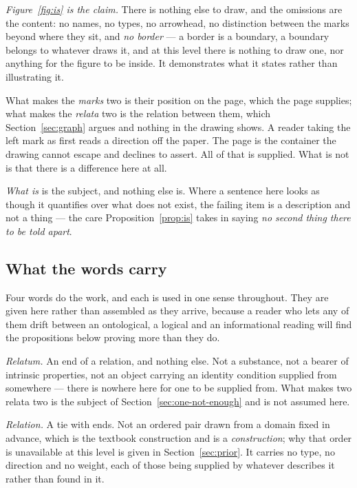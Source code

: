 \documentclass[11pt,a4paper]{article}
\begin{document}
\emph{Figure~\ref{fig:is} is the claim.} There is nothing else to draw, and the omissions are the content: no names, no types, no arrowhead, no distinction between the marks beyond where they sit, and \emph{no border} --- a border is a boundary, a boundary belongs to whatever draws it, and at this level there is nothing to draw one, nor anything for the figure to be inside. It demonstrates what it states rather than illustrating it.

What makes the \emph{marks} two is their position on the page, which the page supplies; what makes the \emph{relata} two is the relation between them, which Section~\ref{sec:graph} argues and nothing in the drawing shows. A reader taking the left mark as first reads a direction off the paper. The page is the container the drawing cannot escape and declines to assert. All of that is supplied. What is not is that there is a difference here at all.

\emph{What is} is the subject, and nothing else is. Where a sentence here looks as though it quantifies
over what does not exist, the failing item is a description and not a thing --- the care Proposition~\ref{prop:is}
takes in saying \emph{no second thing there to be told apart}.

\subsection*{What the words carry}
Four words do the work, and each is used in one sense throughout. They are given here rather than
assembled as they arrive, because a reader who lets any of them drift between an ontological, a
logical and an informational reading will find the propositions below proving more than they do.

\emph{Relatum.} An end of a relation, and nothing else. Not a substance, not a bearer of intrinsic
properties, not an object carrying an identity condition supplied from somewhere --- there is nowhere
here for one to be supplied from. What makes two relata two is the subject of
Section~\ref{sec:one-not-enough} and is not assumed here.

\emph{Relation.} A tie with ends. Not an ordered pair drawn from a domain fixed in advance, which is
the textbook construction and is a \emph{construction}; why that order is unavailable at this level is
given in Section~\ref{sec:prior}. It carries no type, no direction and no weight, each of those being
supplied by whatever describes it rather than found in it.
\end{document}
